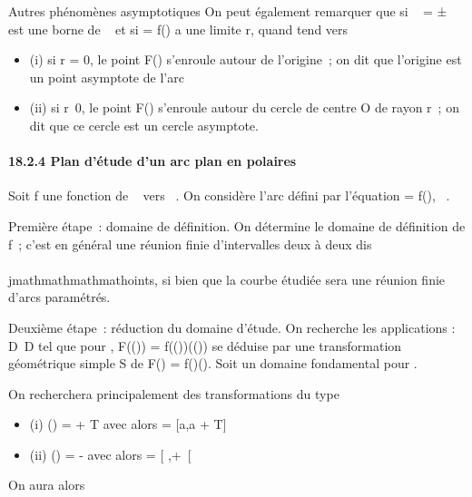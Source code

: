 Autres phénomènes asymptotiques On peut également remarquer que si \alpha~ =
±\infty~ est une borne de \alpha~ et si \rho = f(\theta) a une limite r, quand \theta tend vers \alpha~

\begin{itemize}
\itemsep1pt\parskip0pt
\item
  (i) si r = 0, le point F(\theta) s'enroule autour de l'origine~; on dit que
  l'origine est un point asymptote de l'arc
\item
  (ii) si r\neq~0, le point F(\theta) s'enroule autour
  du cercle de centre O de rayon \textbar{}r\textbar{}~; on dit que ce
  cercle est un cercle asymptote.
\end{itemize}

\paragraph{18.2.4 Plan d'étude d'un arc plan en polaires}

Soit f une fonction de ~ vers ~. On considère l'arc défini par
l'équation \rho = f(\theta), \theta \in {}~.

Première étape~: domaine de définition. On détermine le domaine de
définition de f~; c'est en général une réunion finie d'intervalles deux
à deux dis\\\\jmathmathmathmathoints, si bien que la courbe étudiée sera une réunion finie
d'arcs paramétrés.

Deuxième étape~: réduction du domaine d'étude. On recherche les
applications \sigma : D\rightarrow~D tel que pour \theta \inD, F(\sigma(\theta)) =
f(\sigma(\theta))\vecu(\sigma(\theta)) se déduise par une transformation
géométrique simple S de F(\theta) = f(\theta)\vecu(\theta). Soit \Delta
un domaine fondamental pour \sigma.

On recherchera principalement des transformations \theta du type

\begin{itemize}
\itemsep1pt\parskip0pt
\item
  (i) \sigma(\theta) = \theta + T avec alors \Delta = {[}a,a + T{]} \bigcapD
\item
  (ii) \sigma(\theta) = \omega - \theta avec alors \Delta = {[} \omega {}
  ,+\infty~{[}\bigcapD
\end{itemize}

On aura alors

